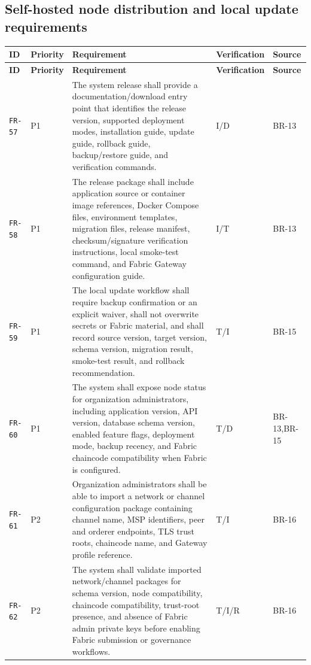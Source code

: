 \documentclass[11pt,a4paper]{article}
\begin{document}
\subsection{Self-hosted node distribution and local update requirements}\label{sec:fr-self-hosted-release}
\begin{footnotesize}
\begin{longtable}{@{}p{}p{}p{}p{}p{}@{}}
\rowcolor{gray!18}\textbf{ID} & \textbf{Priority} & \textbf{Requirement} & \textbf{Verification} & \textbf{Source} \\ \hline
\endfirsthead
\rowcolor{gray!18}\textbf{ID} & \textbf{Priority} & \textbf{Requirement} & \textbf{Verification} & \textbf{Source} \\ \hline
\endhead
\texttt{FR-57} & P1 & The system release shall provide a documentation/download entry point that identifies the release version, supported deployment modes, installation guide, update guide, rollback guide, backup/restore guide, and verification commands. & I/D & BR-13 \\ \hline
\texttt{FR-58} & P1 & The release package shall include application source or container image references, Docker Compose files, environment templates, migration files, release manifest, checksum/signature verification instructions, local smoke-test command, and Fabric Gateway configuration guide. & I/T & BR-13 \\ \hline
\texttt{FR-59} & P1 & The local update workflow shall require backup confirmation or an explicit waiver, shall not overwrite secrets or Fabric material, and shall record source version, target version, schema version, migration result, smoke-test result, and rollback recommendation. & T/I & BR-15 \\ \hline
\texttt{FR-60} & P1 & The system shall expose node status for organization administrators, including application version, API version, database schema version, enabled feature flags, deployment mode, backup recency, and Fabric chaincode compatibility when Fabric is configured. & T/D & BR-13,BR-15 \\ \hline
\texttt{FR-61} & P2 & Organization administrators shall be able to import a network or channel configuration package containing channel name, MSP identifiers, peer and orderer endpoints, TLS trust roots, chaincode name, and Gateway profile reference. & T/I & BR-16 \\ \hline
\texttt{FR-62} & P2 & The system shall validate imported network/channel packages for schema version, node compatibility, chaincode compatibility, trust-root presence, and absence of Fabric admin private keys before enabling Fabric submission or governance workflows. & T/I/R & BR-16 \\ \hline
\end{longtable}
\end{footnotesize}
\end{document}
